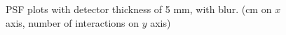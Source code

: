 \documentclass[a4paper]{article}
\begin{document}
\begin{figure}[H]
  \caption{PSF plots with detector thickness of 5 mm, with blur. (cm on $x$ axis, number of interactions on $y$ axis)}
  \label{fig:050_xse}
\end{figure}
\end{document}
